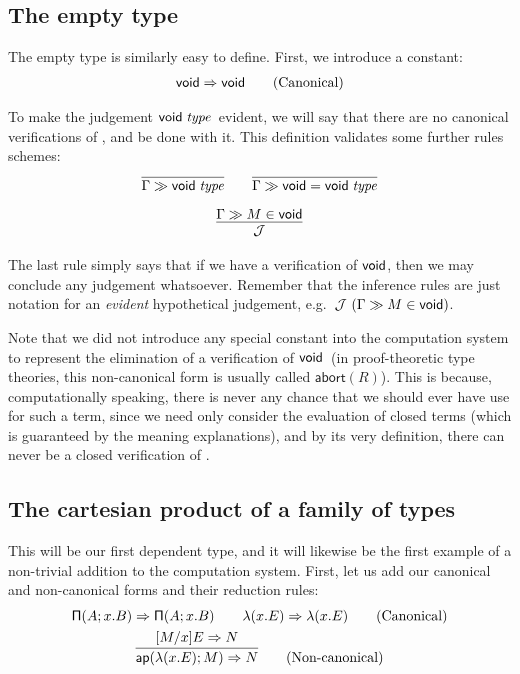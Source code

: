 \documentclass[main.tex]{subfiles}
\begin{document}
\subsection{The empty type}

The empty type is similarly easy to define. First, we introduce a constant:
\begin{gather*}
  \mathsf{void}\Rightarrow\mathsf{void}\tag{Canonical}
\end{gather*}

To make the judgement $\mathsf{void}\;\mathit{type}$\ evident, we will say that there are no
canonical verifications of \tyvoid, and be done with it. This definition
validates some further rules schemes:
\begin{gather*}
  \infer{
    \sequent\Gamma\isset\tyvoid
  }{
  }\qquad
  \infer{
    \sequent\Gamma\isset{\tyvoid=\tyvoid}
  }{
  }\\[6pt]
  \infer{
    \mathcal{J}
  }{
    \sequent\Gamma\ver{M}{\tyvoid}
  }
\end{gather*}

The last rule simply says that if we have a verification of $\mathsf{void}$, then we
may conclude any judgement whatsoever. Remember that the inference rules are
just notation for an \emph{evident} hypothetical judgement, e.g.\
$\mathcal{J}\ (\Gamma\gg M\in\mathsf{void})$.

Note that we did not introduce any special constant into the
computation system to represent the elimination of a verification of
$\mathsf{void}$\ (in proof-theoretic type theories, this non-canonical form
is usually called $\mathsf{abort}(R)$).  This is because,
computationally speaking, there is never any chance that we should
ever have use for such a term, since we need only consider the
evaluation of closed terms (which is guaranteed by the meaning
explanations), and by its very definition, there can never be a closed
verification of \tyvoid.

\subsection{The cartesian product of a family of types}

This will be our first dependent type, and it will likewise be the first
example of a non-trivial addition to the computation system. First, let us add
our canonical and non-canonical forms and their reduction rules:
\begin{gather*}
  \reduce{\typrod{A}{x}{B}}{\typrod{A}{x}{B}}
  \qquad
  \reduce{\lam{x}{E}}{\lam{x}{E}}
  \tag{Canonical}\\
  \infer{
    \reduce{\ap{\lam{x}{E}}{M}}{N}
  }{
    \reduce{[M/x]E}{N}
  }\tag{Non-canonical}
\end{gather*}
\end{document}
